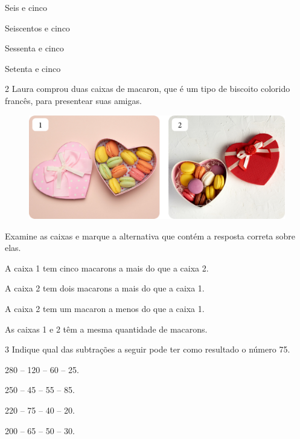 \begin{escolha}[itemsep=-5pt]
\item Seis e cinco

\item Seiscentos e cinco

\item Sessenta e cinco

\item Setenta e cinco
\end{escolha}

\num{2} Laura comprou duas caixas de macaron, que é um tipo de biscoito colorido
francês, para presentear suas amigas. 

\begin{figure}[H]
\includegraphics[width=\textwidth]{./media/image152.png}
\end{figure}

Examine as caixas e marque a
alternativa que contém a resposta correta sobre elas.

\begin{escolha}[itemsep=-5pt]
\item A caixa 1 tem cinco macarons a mais do que a caixa 2.

\item A caixa 2 tem dois macarons a mais do que a caixa 1.

\item A caixa 2 tem um macaron a menos do que a caixa 1.

\item As caixas 1 e 2 têm a mesma quantidade de macarons.
\end{escolha}

\num{3} Indique qual das subtrações a seguir pode ter como resultado o número 75.

\begin{escolha}[itemsep=-5pt]
\item 280 -- 120 -- 60 -- 25.

\item 250 -- 45 -- 55 -- 85.

\item 220 -- 75 -- 40 -- 20.

\item 200 -- 65 -- 50 -- 30.
\end{escolha}

